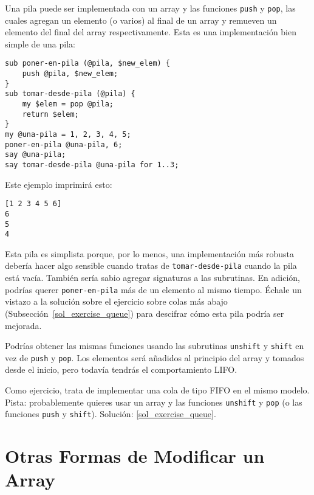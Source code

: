 Una pila puede ser implementada con un array y las funciones
{\tt push} y {\tt pop}, las cuales agregan un elemento (o varios)
al final de un array y remueven un elemento del final del array 
respectivamente. Esta es una implementación bien simple de una pila:
\label{stack_code}

\begin{verbatim}
sub poner-en-pila (@pila, $new_elem) {
	push @pila, $new_elem;
}
sub tomar-desde-pila (@pila) {
    my $elem = pop @pila;
    return $elem;
}
my @una-pila = 1, 2, 3, 4, 5;
poner-en-pila @una-pila, 6;
say @una-pila;
say tomar-desde-pila @una-pila for 1..3;
\end{verbatim}

Este ejemplo imprimirá esto:

\begin{verbatim}
[1 2 3 4 5 6]
6
5
4
\end{verbatim}

Esta pila es simplista porque, por lo menos, una implementación
más robusta debería hacer algo sensible cuando tratas de 
{\tt tomar-desde-pila} cuando la pila está vacía. También sería
sabio agregar signaturas a las subrutinas. En adición, podrías querer
{\tt poner-en-pila} más de un elemento al mismo tiempo. Échale un
vistazo a la solución sobre el ejercicio sobre colas más abajo
(Subsección~\ref{sol_exercise_queue}) para descifrar cómo esta pila
podría ser mejorada.

Podrías obtener las mismas funciones usando las subrutinas
{\tt unshift} y {\tt shift} en vez de {\tt push} y {\tt pop}.
Los elementos será añadidos al principio del array y tomados
desde el inicio, pero todavía tendrás el comportamiento LIFO.

\label{exercise_queue}
Como ejercicio, trata de implementar una cola de tipo FIFO en el
mismo modelo. Pista: probablemente quieres usar un array y las
funciones {\tt unshift} y {\tt pop} (o las funciones 
{\tt push} y {\tt shift}). Solución: \ref{sol_exercise_queue}.

\section{Otras Formas de Modificar un Array}
\label{modify_array}

